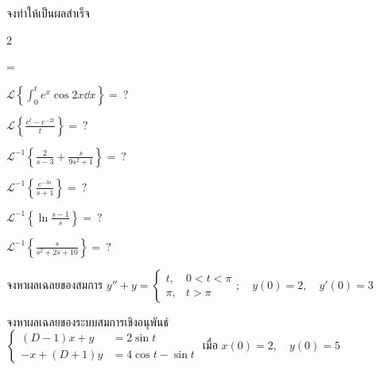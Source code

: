 \documentclass[12pt,final]{novelette} %
\begin{document}
\begin{question}[resume]
    \item {}
    จงทำให้เป็นผลสำเร็จ 
    \begin{multicols}{2}
        \begin{question}
            \everymath={\displaystyle}
            \item
            $\mathcal{L}\left\{\int_0^t e^x \cos 2x \dd{x}\right\} = \ ?$

            \item
            $\mathcal{L}\left\{\frac{e^t - e^{-2t}}{t}\right\} = \ ?$

            \item
            $\mathcal{L}^{-1}\left\{\frac{2}{s-3} + \frac{s}{9s^2+1}\right\} = \ ?$

            \item
            $\mathcal{L}^{-1}\left\{\frac{e^{-3s}}{s+1}\right\} = \ ?$

            \item
            $\mathcal{L}^{-1}\left\{\ln \frac{s-1}{s}\right\} = \ ?$

            \item
            $\mathcal{L}^{-1}\left\{\frac{s}{s^2+2s+10}\right\} = \ ?$
        \end{question}
    \end{multicols}

    \item {}
    จงหาผลเฉลยของสมการ $\displaystyle y'' + y =
        \begin{cases}
            t,   & 0 < t < \pi \\
            \pi, & t > \pi
        \end{cases} ; \quad y(0) = 2, \quad y'(0) = 3$ 



    \item {}
    จงหาผลเฉลยของระบบสมการเชิงอนุพันธ์\\[.5em]
    \hspace*{.5cm}$
        \left\{\begin{aligned}
            (D-1)x + y  & = 2 \sin t         \\[.2em]
            -x + (D+1)y & = 4\cos t - \sin t
        \end{aligned}\right.
    $ \quad เมื่อ $x(0) = 2, \quad y(0) = 5$ 



\end{question}
\end{document}
